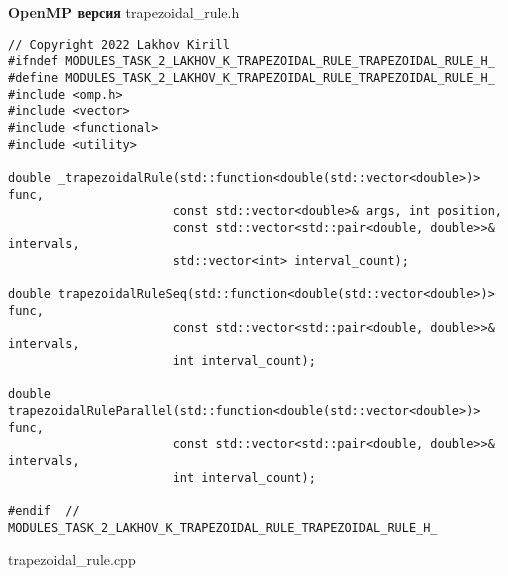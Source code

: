 \documentclass{report}
\begin{document}
\newpage
\textbf{OpenMP версия}
\newline
\newline trapezoidal\_rule.h
\begin{lstlisting}
// Copyright 2022 Lakhov Kirill
#ifndef MODULES_TASK_2_LAKHOV_K_TRAPEZOIDAL_RULE_TRAPEZOIDAL_RULE_H_
#define MODULES_TASK_2_LAKHOV_K_TRAPEZOIDAL_RULE_TRAPEZOIDAL_RULE_H_
#include <omp.h>
#include <vector>
#include <functional>
#include <utility>

double _trapezoidalRule(std::function<double(std::vector<double>)> func,
                       const std::vector<double>& args, int position,
                       const std::vector<std::pair<double, double>>& intervals,
                       std::vector<int> interval_count);

double trapezoidalRuleSeq(std::function<double(std::vector<double>)> func,
                       const std::vector<std::pair<double, double>>& intervals,
                       int interval_count);

double trapezoidalRuleParallel(std::function<double(std::vector<double>)> func,
                       const std::vector<std::pair<double, double>>& intervals,
                       int interval_count);

#endif  // MODULES_TASK_2_LAKHOV_K_TRAPEZOIDAL_RULE_TRAPEZOIDAL_RULE_H_
\end{lstlisting}
trapezoidal\_rule.cpp
\end{document}

